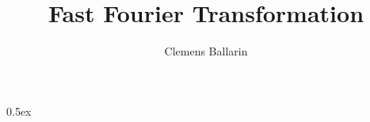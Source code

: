 \documentclass[12pt,a4paper]{article}
\begin{document}
\title{Fast Fourier Transformation }
\author{Clemens Ballarin}
\maketitle

\tableofcontents

\parindent 0pt\parskip 0.5ex



%
%
\end{document}
